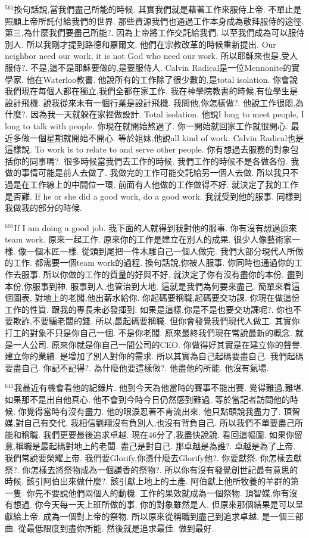 \documentclass{book}
\begin{document}
$^{561}$換句話說,當我們盡己所能的時候.
其實我們就是藉著工作來服侍上帝.
不單止是照顧上帝所託付給我們的世界.
那些資源我們也通過工作本身成為敬拜服侍的途徑.
第三,為什麼我們要盡己所能?.
因為上帝將工作交託給我們.
以至我們成為可以服侍別人.
所以我剛才提到路德和嘉爾文.
他們在宗教改革的時候重新提出.
Our neighbor need our work, it is not God who need our work.
所以耶穌來也是,受人服侍?.
不是,這不是耶穌要做的,是要服侍人.
Calvin Radical是一位Mennonite的實學家.
他在Waterloo教書.
他說所有的工作除了很少數的,是total isolation.
你會說我們現在每個人都在獨立,我們全都在家工作.
我在神學院教書的時候,有位學生是設計飛機.
說我從來未有一個行業是設計飛機.
我問他,你怎樣做?.
他說工作很悶,為什麼?.
因為我一天就躲在家裡做設計.
Total isolation.
他說I long to meet people, I long to talk with people.
你現在就開始熬過了.
你一開始就回家工作就很開心.
最近多做一個星期就開始不開心.
等於姐妹,他說all kind of work.
Calvin Radical也是這樣說.
To work is to relate to and serve other people.
你有想過去服務的對象包括你的同事嗎?.
很多時候當我們去工作的時候.
我們工作的時候不是各做各份.
我做的事情可能是前人去做了.
我做完的工作可能交託給另一個人去做.
所以我只不過是在工作線上的中間位一環.
前面有人他做的工作做得不好.
就決定了我的工作是否難.
If he or she did a good work, do a good work.
我就受到他的服事.
同樣到我做我的部分的時候.

$^{601}$If I am doing a good job.
我下面的人就得到我對他的服事.
你有沒有想過原來team work.
原來一起工作.
原來你的工作是建立在別人的成果.
很少人像藝術家一樣.
像一個木匠一樣.
從頭到尾把一件木雕自己一個人做完.
我們大部分現代人所做的工作.
都需要一個team work的過程.
換句話說,你被人服事.
你同時也通過你的工作去服事.
所以你做的工作的質量的好與不好.
就決定了你有沒有盡你的本份.
盡到本份,你服事到神.
服事到人,也管治到大地.
這就是我們為何要來盡己.
簡單來看這個圖表.
對地上的老闆,他出薪水給你.
你起碼要稱職,起碼要交功課.
你現在做這份工作的性質.
跟我的專長未必發揮到.
如果是這樣,你是不是也要交功課呢?.
你也不要欺詐,不要騙老闆的錢.
所以,最起碼要稱職.
但你會發覺我們現代人做工.
其實你打工的對象不只是你自己一個.
不是你老闆.
原來最終我們現在常說最新的概念.
就是一人公司.
原來你就是你自己一間公司的CEO.
你做得好其實是在建立你的聲譽.
建立你的業績.
是增加了別人對你的需求.
所以其實為自己起碼要盡自己.
我們起碼要盡自己.
你記不記得?.
為什麼他要這樣做?.
他盡他的所能.
他沒有氣場.

$^{641}$我最近有機會看他的紀錄片.
他到今天為他當時的賽事不能出賽.
覺得難過,難堪.
如果那不是出自他真心.
他不會到今時今日仍然感到難過.
等於當記者訪問他的時候.
你覺得當時有沒有盡力.
他的眼淚忍著不肯流出來.
他只點頭說我盡力了.
頂智媒,對自己有交代.
我相信劉翔沒有負別人,也沒有背負自己.
所以我們不單要盡己所能和稱職.
我們更要最後追求卓越.
現在46分了,我盡快說說.
看回這幅圖.
如果你留意,稱職是最起碼對地上的老闆.
盡己是對自己.
那卓越是為誰?.
卓越是為了上帝.
我們常說要榮耀上帝.
我們要Glorify,你憑什麼去Glorify他?.
你要獻祭.
你怎樣去獻祭?.
你怎樣去將祭物成為一個謙香的祭物?.
所以你有沒有發覺創世記最有意思的時候.
該引阿伯出來做什麼?.
該引獻上地上的土產.
阿伯獻上他所牧養的羊群的第一隻.
你先不要說他們兩個人的動機.
工作的果效就成為一個祭物.
頂智媒,你有沒有想過.
你今天每一天上班所做的事.
你的對象雖然是人.
但原來那個結果是可以呈獻給上帝.
成為一個對上帝的祭物.
所以原來從稱職到盡己到追求卓越.
是一個三部曲.
從最低限度到盡你所能.
然後就是追求最佳.
做到最好.
\end{document}
